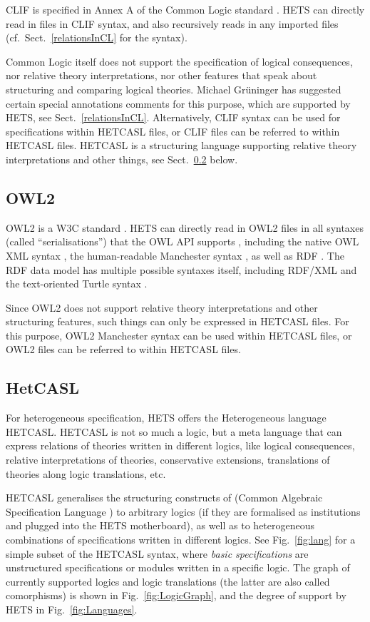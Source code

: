 \documentclass{article}
\newcommand{\normalTEXTSC}[2]{{#1\scriptsize#2}}
\newcommand     {\Hets}{\normalTEXTSC{H}{ETS}\xspace}
\newcommand{\HetCASL}{\normalTEXTSC{H}{ET}\normalTEXTSC{C}{ASL}\xspace}
\begin{document}
CLIF is specified in Annex A of the Common Logic standard
\cite{CommonLogic:oldfashioned}. \Hets can directly read in files in
CLIF syntax, and also recursively reads in any imported files (cf.\ Sect.~\ref{relationsInCL} for the syntax).

Common Logic itself does not support the specification of logical
consequences, nor relative theory interpretations, nor other
features that speak about structuring and comparing logical
theories. Michael Gr\"uninger has suggested certain special annotations comments for
this purpose, which are supported by \Hets, see
Sect.~\ref{relationsInCL}.  Alternatively, CLIF syntax can be used
for specifications within \HetCASL files, or CLIF files can be referred to within \HetCASL
files.  \HetCASL is a structuring language supporting relative theory
interpretations and other things, see Sect.~\ref{HetCASL} below.

\subsection{OWL2}

OWL2 is a W3C standard \cite{w3c:owl2-overview}.
\Hets can directly read in OWL2 files in all syntaxes (called ``serialisations'') that the OWL API supports \cite{OWLAPI:URL}, including
the native OWL XML syntax \cite{w3c:owl2-xml},  the human-readable
Manchester syntax \cite{w3c:owl2-manchester}, as well as RDF \cite{w3c:owl2-RDF-mapping}.  The RDF data model has multiple possible syntaxes itself, including RDF/XML \cite{w3c04:rdf-xml} and the text-oriented Turtle syntax \cite{w3c:turtle}.

Since OWL2 does not support relative theory interpretations and other
structuring features, such things can only be expressed in \HetCASL
files. For this purpose, OWL2 Manchester syntax can be used within
\HetCASL files, or OWL2 files can be referred to within \HetCASL files.

\subsection{HetCASL}
\label{HetCASL}
For heterogeneous specification, \Hets offers the Heterogeneous
language \HetCASL.  \HetCASL is not so much a logic, but a meta
language that can express relations of theories written in different
logics, like logical consequences, relative interpretations of
theories, conservative extensions, translations of theories
along logic translations, etc.

 \HetCASL generalises the structuring
constructs of
\CASL (Common Algebraic Specification Language \cite{CASL-UM,CASL/RefManual}) to arbitrary logics
(if they are formalised as institutions and plugged into
the \Hets motherboard), as well as to heterogeneous
combinations of specifications written in different logics.
See
Fig.~\ref{fig:lang} for a simple subset of the
\HetCASL syntax, where \emph{basic specifications} are unstructured
specifications or modules written in a specific logic.  The graph of
currently supported logics and logic translations (the latter are also
called comorphisms) is shown in Fig.~\ref{fig:LogicGraph}, and the
degree of support by \Hets in Fig.~\ref{fig:Languages}.
\end{document}
